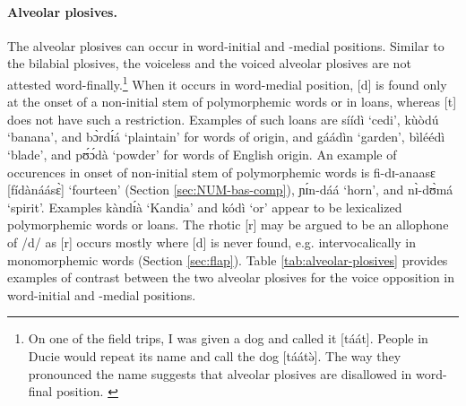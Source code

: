 \newpage 
\paragraph{Alveolar plosives.}
\label{sec:PHO-alveo-plos}  

The alveolar plosives can occur in word-initial and  -medial positions. Similar
to the bilabial plosives, the voiceless and the voiced alveolar plosives  are
not attested word-finally.\footnote{On one of the field trips, I was given a dog
and  called it [{\sls táát}]. People in Ducie would repeat its name and call 
the 
dog
[{\sls táátə̀}]. The way they pronounced the name suggests that alveolar 
plosives are disallowed in word-final position. \label{fn:taat-epenthesis}}  
When it occurs in word-medial position,  [{d}] is found only at the onset of a non-initial stem of polymorphemic words or in loans, whereas [{t}] does 
not 
have such a restriction. Examples of such loans are  {\sls síídì} `cedi', 
{\sls kùòdú} `banana', and {\sls bɔ̀rdɪ́á} `plaintain'  for words of  
origin, and  {\sls gáádìn} `garden', {\sls bìléédì} `blade',  and 
{\sls pʊ́ɔ́dà} `powder' for words of English origin. An example of occurences 
in onset of non-initial stem of polymorphemic words is {\sls fi-dɪ-anaasɛ} 
[{\sls fídànáásɛ̀}] `fourteen' (Section \ref{sec:NUM-bas-comp}),   
{\sls ɲɪ́n-dáá}	`horn', and {\sls nɪ̀-dʊ̀má}  `spirit'.  Examples 
{\sls kàndɪ́à} `Kandia'  and {\sls kódì} `or' appear to be lexicalized 
polymorphemic words or loans. The rhotic [{r}] may be argued to be an 
allophone of /{d}/ as   [{r}] occurs mostly where [{d}] is 
never 
found, e.g. intervocalically in monomorphemic words (Section \ref{sec:flap}). 
Table \ref{tab:alveolar-plosives} provides examples of contrast between the two 
alveolar plosives for the {\sc voice} opposition in word-initial and  -medial 
positions.


